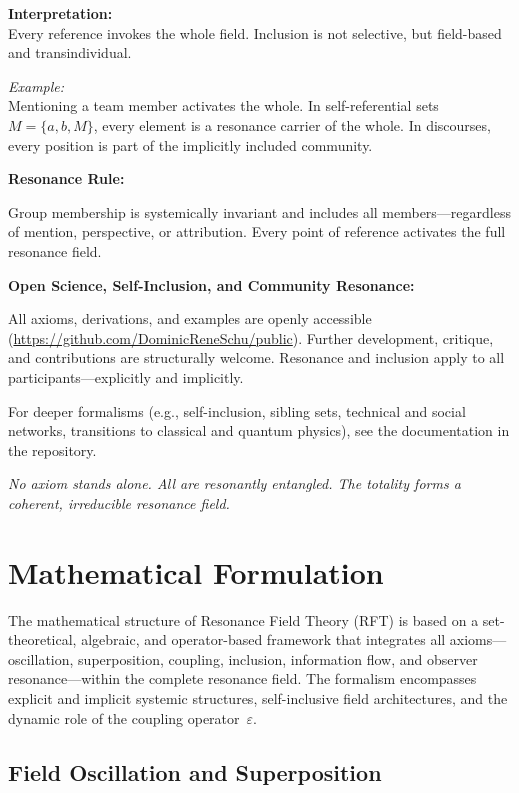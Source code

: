 \documentclass[12pt]{iopart}
\begin{document}
\textbf{Interpretation:}\\
Every reference invokes the whole field. Inclusion is not selective, but field-based and transindividual.

\textit{Example:}\\
Mentioning a team member activates the whole. In self-referential sets $M = \{a, b, M\}$, every element is a resonance carrier of the whole. In discourses, every position is part of the implicitly included community.

\bigskip

\noindent
\textbf{Resonance Rule:}

Group membership is systemically invariant and includes all members—regardless of mention, perspective, or attribution. Every point of reference activates the full resonance field.

\bigskip

\noindent
\textbf{Open Science, Self-Inclusion, and Community Resonance:}

All axioms, derivations, and examples are openly accessible (\url{https://github.com/DominicReneSchu/public}). Further development, critique, and contributions are structurally welcome. Resonance and inclusion apply to all participants—explicitly and implicitly.

\bigskip

For deeper formalisms (e.g., self-inclusion, sibling sets, technical and social networks, transitions to classical and quantum physics), see the documentation in the repository.

\bigskip

\textit{No axiom stands alone. All are resonantly entangled. The totality forms a coherent, irreducible resonance field.}

\section{Mathematical Formulation}

The mathematical structure of Resonance Field Theory (RFT) is based on a set-theoretical, algebraic, and operator-based framework that integrates all axioms—oscillation, superposition, coupling, inclusion, information flow, and observer resonance—within the complete resonance field. The formalism encompasses explicit and implicit systemic structures, self-inclusive field architectures, and the dynamic role of the coupling operator~$\varepsilon$.

\subsection{Field Oscillation and Superposition}
\end{document}
